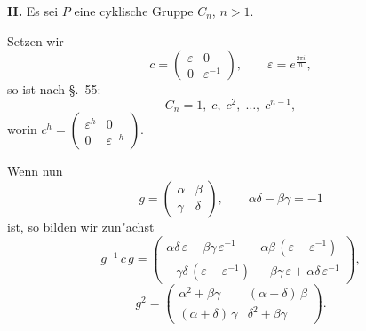 \documentclass[12pt,a4paper]{article}
\theoremstyle{plain}
\theoremstyle{definition}
\theoremstyle{remark}
\begin{document}
\medskip\noindent\textbf{II.} Es sei $P$ eine cyklische Gruppe $C_{n}$, $n > 1$.

Setzen wir
\begin{equation}\tag{3}
c = \begin{pmatrix} \varepsilon & 0 \\ 0 & \varepsilon^{-1} \end{pmatrix},\qquad \varepsilon = e^{\frac{2\pi i}{n}},
\end{equation}
so ist nach \S.~55:
\begin{equation}\tag{4}
C_{n} = 1,\; c,\; c^{2},\; \ldots,\; c^{n-1},
\end{equation}
worin $c^{h} = \begin{pmatrix} \varepsilon^{h} & 0 \\ 0 & \varepsilon^{-h} \end{pmatrix}$.

Wenn nun
\begin{equation}\tag{5}
g = \begin{pmatrix} \alpha & \beta \\ \gamma & \delta \end{pmatrix},\qquad \alpha\delta - \beta\gamma = -1
\end{equation}
ist, so bilden wir zun"achst
\begin{equation}\tag{6}
g^{-1}\,c\,g = \begin{pmatrix} \alpha\delta\,\varepsilon - \beta\gamma\,\varepsilon^{-1} & \alpha\beta\,(\varepsilon - \varepsilon^{-1}) \\ -\gamma\delta\,(\varepsilon - \varepsilon^{-1}) & -\beta\gamma\,\varepsilon + \alpha\delta\,\varepsilon^{-1} \end{pmatrix},
\end{equation}
\begin{equation}\tag{7}
g^{2} = \begin{pmatrix} \alpha^{2} + \beta\gamma & (\alpha + \delta)\,\beta \\ (\alpha + \delta)\,\gamma & \delta^{2} + \beta\gamma \end{pmatrix}.
\end{equation}
\end{document}
